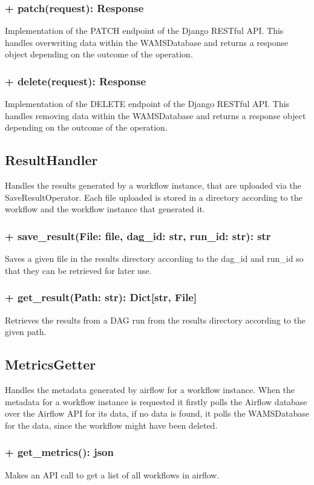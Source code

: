 \subsubsection{+ patch(request): Response}
Implementation of the PATCH endpoint of the Django RESTful API. This handles overwriting data within the WAMSDatabase and returns a response object depending on the outcome of the operation.
\subsubsection{+ delete(request): Response}
Implementation of the DELETE endpoint of the Django RESTful API. This handles removing data within the WAMSDatabase and returns a response object depending on the outcome of the operation.

\subsection{ResultHandler}
Handles the results generated by a workflow instance, that are uploaded via the
SaveResultOperator. Each file uploaded is stored in a directory according to the workflow
and the workflow instance that generated it.

\subsubsection{+ save\_result(File: file, dag\_id: str, run\_id: str): str}
Saves a given file in the results directory according to the dag\_id and run\_id so that they can
be retrieved for later use.
\subsubsection{+ get\_result(Path: str): Dict[str, File]}
Retrieves the results from a DAG run from the results directory according to the given path.


\subsection{MetricsGetter}
Handles the metadata generated by airflow for a workflow instance. When the metadata for a
workflow instance is requested it firstly polls the Airflow database over the Airflow API
for its data, if no data is found, it polls the WAMSDatabase for the data, since the workflow
might have been deleted.

\subsubsection{+ get\_metrics(): json}
Makes an API call to get a list of all workflows in airflow.

